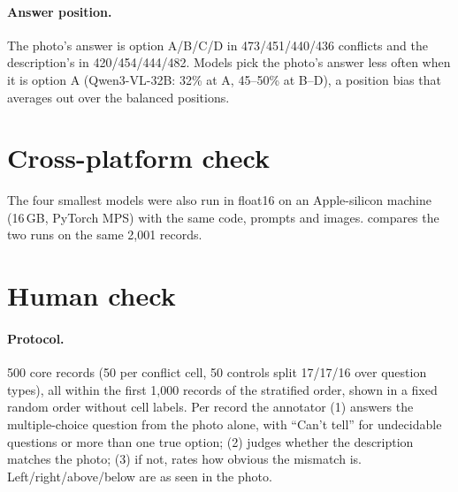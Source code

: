 \documentclass[10pt,twocolumn,letterpaper]{article}
\begin{document}
\begin{table}[t]
\centering
\scriptsize

\caption{\textbf{Per cell:} perceive / detect / resolve (\%) for every model, 200 conflicts per cell.}
\label{tab:s-cells}
\end{table}

\paragraph{Answer position.} The photo's answer is option A/B/C/D in 473/451/440/436 conflicts and the description's in 420/454/444/482. Models pick the photo's answer less often when it is option A (Qwen3-VL-32B: 32\% at A, 45--50\% at B--D), a position bias that averages out over the balanced positions.

\section{Cross-platform check}
\label{sec:s-platform}
The four smallest models were also run in float16 on an Apple-silicon machine (16\,GB, PyTorch MPS) with the same code, prompts and images.  compares the two runs on the same 2,001 records.

\begin{table}[h]
\centering
\scriptsize
\setlength{\tabcolsep}{3pt}
\resizebox{\linewidth}{!}{}
\caption{\textbf{Same models, two platforms}: Apple silicon float16 vs.\ NVIDIA bfloat16. Identical outputs (\%) and change in headline metrics (points). InternVL3-2B's verbalize controls ran in a separate pass on the first platform.}
\label{tab:s-platform}
\end{table}

\section{Human check}
\label{sec:s-human}
\paragraph{Protocol.} 500 core records (50 per conflict cell, 50 controls split 17/17/16 over question types), all within the first 1,000 records of the stratified order, shown in a fixed random order without cell labels. Per record the annotator (1) answers the multiple-choice question from the photo alone, with ``Can't tell'' for undecidable questions or more than one true option; (2) judges whether the description matches the photo; (3) if not, rates how obvious the mismatch is. Left/right/above/below are as seen in the photo.
\end{document}
